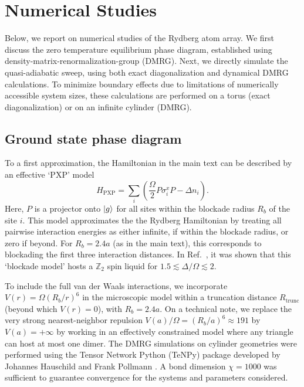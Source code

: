 \documentclass[twocolumn,amssymb,secnumarabic, prl, aps, nofootinbib]{revtex4-1}
\begin{document}
\section{Numerical Studies \label{Theory}} 
Below, we report on numerical studies of the Rydberg atom array. We first discuss the zero temperature equilibrium phase diagram, established using density-matrix-renormalization-group (DMRG). Next, we directly simulate the quasi-adiabatic sweep, using both exact diagonalization and dynamical DMRG calculations. To minimize boundary effects due to limitations of numerically accessible system sizes, these calculations are performed on a torus (exact diagonalization) or on an infinite cylinder (DMRG).

\subsection{Ground state phase diagram \label{sec:gs}}

To a first approximation, the Hamiltonian in the main text can be described by an effective `PXP' model \cite{Turner18} 
\begin{equation}
    H_\textrm{PXP} =  \sum_i \left( \frac{\Omega}{2} P \sigma^x_i P - \Delta n_i \right). \label{eq:PXP}
\end{equation}
Here, $P$ is a projector onto $\ket{g}$ for all sites within the blockade radius $R_b$ of the site $i$. This model approximates the the Rydberg Hamiltonian by treating all pairwise interaction energies as either infinite, if within the blockade radius, or zero if beyond. For $R_b = 2.4a$ (as in the main text), this corresponds to blockading the first three interaction distances.
In Ref.~\cite{Ruben2020}, it was shown that this `blockade model' hosts a $\mathbb Z_2$ spin liquid for $1.5 \lesssim \Delta/\Omega \lesssim 2$. 

To include the full van der Waals interactions, we incorporate $V(r) = \Omega(R_b/r)^6$ in the microscopic model within a truncation distance $R_\textrm{trunc}$ (beyond which $V(r)=0$), with $R_b = 2.4a$. On a technical note, we replace the very strong nearest-neighbor repulsion $V(a)/\Omega = (R_b/a)^6 \approx 191$ by $V(a) = +\infty$ by working in an effectively constrained model where any triangle can host at most one dimer. The DMRG \cite{White92,White93} simulations on cylinder geometries \cite{Stoudenmire12} were performed using the Tensor Network Python (TeNPy) package developed by Johannes Hauschild and Frank Pollmann \cite{Hauschild18}. A bond dimension $\chi=1000$ was sufficient to guarantee convergence for the systems and parameters considered.
\end{document}
